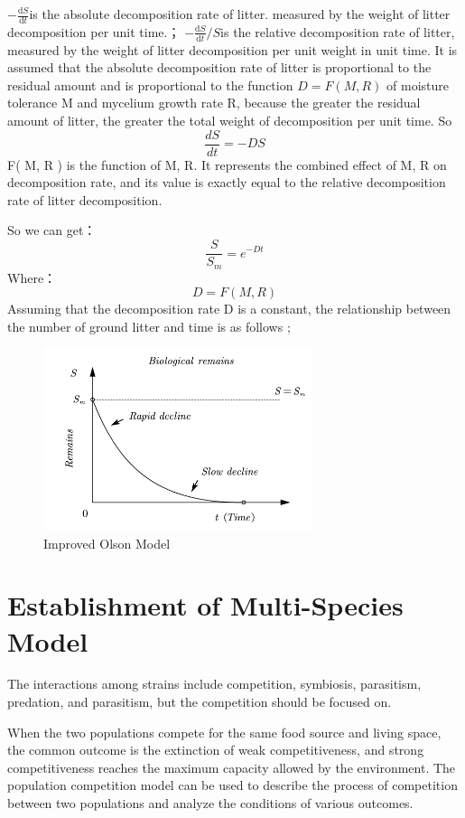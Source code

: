 \documentclass{mcmthesis}
\begin{document}
$-\frac{\mathrm{d} S}{\mathrm{d} t}$is the absolute decomposition rate of litter. measured by the weight of litter decomposition per unit time.； $-\frac{\mathrm{d} S}{\mathrm{d} t} / S$is the relative decomposition rate of litter, measured by the weight of litter decomposition per unit weight in unit time. It is assumed that the absolute decomposition rate of litter is proportional to the residual amount and is proportional to the function $ D = F ( M, R ) $ of moisture tolerance M and mycelium growth rate R, because the greater the residual amount of litter, the greater the total weight of decomposition per unit time. So
$$\frac{d S}{d t}=-D S$$
F( M, R ) is the function of M, R. It represents the combined effect of M, R on decomposition rate, and its value is exactly equal to the relative decomposition rate of litter decomposition.

So we can get：$$\frac{S}{S_m}=e^{-D t}$$
Where：$$D=F(M,R)$$
Assuming that the decomposition rate D is a constant, the relationship between the number of ground litter and time is as follows ;
\begin{figure}[H]
	\centering
	\includegraphics[width=0.7\textwidth]{img/olson模型.png}
	\caption{Improved Olson Model}\label{fig:olson模型}
\end{figure}
\section{Establishment of Multi-Species Model}
The interactions among strains include competition, symbiosis, parasitism, predation, and parasitism, but the competition should be focused on.             

When the two populations compete for the same food source and living space, the common outcome is the extinction of weak competitiveness, and strong competitiveness reaches the maximum capacity allowed by the environment. The population competition model can be used to describe the process of competition between two populations and analyze the conditions of various outcomes.
\end{document}
